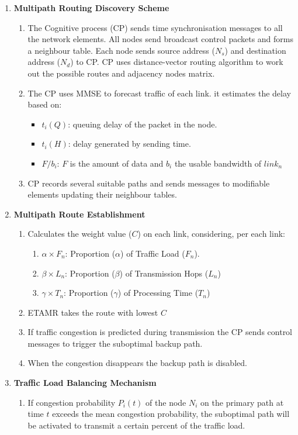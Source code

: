 \begin{enumerate}

\item \textbf{Multipath Routing Discovery Scheme}
	\begin{enumerate}
	\item The Cognitive process (CP) sends time synchronisation messages to all the network elements. All nodes send broadcast control packets and forms a neighbour table. Each node sends source address ($N_{s}$) and destination address ($N_{d}$) to CP. CP uses distance-vector routing algorithm to work out the possible routes and adjacency nodes matrix.
	\item The CP uses MMSE to forecast traffic of each link. it estimates the delay based on:
		\begin{itemize}
		\item $t_{i}(Q)$: queuing delay of the packet in the node.
		\item $t_{i}(H)$: delay generated by sending time.
		\item $F/b_{i}$: $F$ is the amount of data and $b_{i}$ the usable bandwidth of $link_{n}$
		\end{itemize}
	\item CP records several suitable paths and sends messages to modifiable elements updating their neighbour tables.\\	
	\end{enumerate}

\item \textbf{Multipath Route Establishment}
	\begin{enumerate}
	\item Calculates the weight value ($C$) on each link, considering, per each link: 
		\begin{enumerate}
		\item $\alpha\times F_{n}$: Proportion ($\alpha$) of Traffic Load ($F_{n}$).
		\item $\beta\times L_{n}$: Proportion ($\beta$) of Transmission Hops ($L_{n}$)
		\item $\gamma\times T_{n}$: Proportion ($\gamma$) of Processing Time ($T_{n}$)
		\end{enumerate}
 	\item ETAMR takes the route with lowest $C$
	\item If traffic congestion is predicted during transmission the CP sends control messages to trigger the suboptimal backup path.
	\item When the congestion disappears the backup path is disabled.\\ 
	\end{enumerate}


\item \textbf{Traffic Load Balancing Mechanism}
	\begin{enumerate}
	\item If congestion probability $P_{i}(t)$ of the node $N_{i}$ on the primary path at time $t$ exceeds the mean congestion probability, the suboptimal path will be activated to transmit a certain percent of the traffic load.
	\end{enumerate}

	
\end{enumerate}



